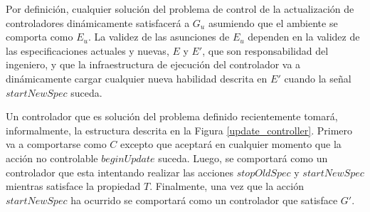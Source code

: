 Por definición, cualquier solución del problema de control de la actualización de controladores dinámicamente
satisfacerá a $G_u$ asumiendo que el ambiente se comporta como $E_u$. La validez de las asunciones de $E_u$ dependen en
la validez de las especificaciones actuales y nuevas, $E$ y $E'$, que son responsabilidad del ingeniero, y que la
infraestructura de ejecución del controlador va a dinámicamente cargar cualquier nueva habilidad descrita en $E'$ cuando
la señal $startNewSpec$ suceda.

Un controlador que es solución del problema definido recientemente tomará, informalmente, la estructura descrita en la
Figura \ref{update_controller}. Primero va a comportarse como $C$ excepto que aceptará en cualquier momento que la acción no controlable
$beginUpdate$ suceda. Luego, se comportará como un controlador que esta intentando realizar las acciones $stopOldSpec$ y
$startNewSpec$ mientras satisface la propiedad $T$. Finalmente, una vez que la acción $startNewSpec$ ha ocurrido se
comportará como un controlador que satisface $G'$.


